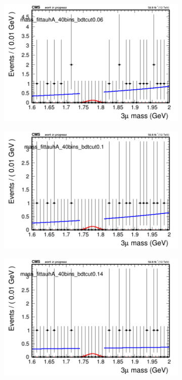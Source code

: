 \begin{figure}[H]
\begin{subfigure}{0.2\textwidth}
        \includegraphics[width=\textwidth]{unfixed_exp/plots/tauhA/massfit_tauhA_40bins_bdtcut0.06.png}
        \caption{}
    \end{subfigure}
    \begin{subfigure}{0.2\textwidth}
        \includegraphics[width=\textwidth]{unfixed_exp/plots/tauhA/massfit_tauhA_40bins_bdtcut0.1.png}
        \caption{}
    \end{subfigure}
    \begin{subfigure}{0.2\textwidth}
        \includegraphics[width=\textwidth]{unfixed_exp/plots/tauhA/massfit_tauhA_40bins_bdtcut0.14.png}

\end{subfigure}
\end{figure}
